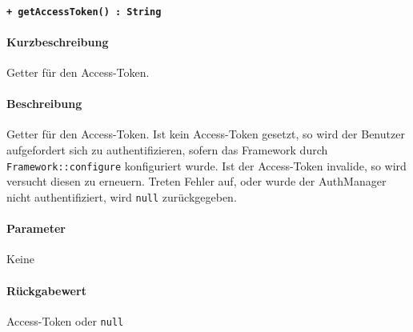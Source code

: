 \paragraph{\texttt{+ getAccessToken() : String}}%
\paragraph*{Kurzbeschreibung}
Getter für den Access-Token.
\paragraph*{Beschreibung}
Getter für den Access-Token.
Ist kein Access-Token gesetzt, so wird der Benutzer aufgefordert sich zu authentifizieren, sofern das Framework durch \verb#Framework::configure# konfiguriert wurde.
Ist der Access-Token invalide, so wird versucht diesen zu erneuern.
Treten Fehler auf, oder wurde der AuthManager nicht authentifiziert, wird \verb#null# zurückgegeben.
\paragraph*{Parameter}
Keine
\paragraph*{Rückgabewert}
Access-Token oder \verb#null#